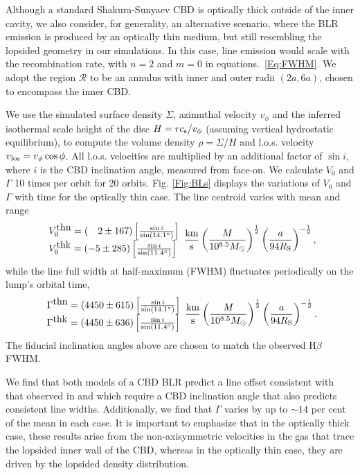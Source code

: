 Although a standard Shakura-Sunyaev CBD is optically thick outside of
the inner cavity, we also consider, for generality, an alternative
scenario, where the BLR emission is produced by an optically thin
medium, but still resembling the lopsided geometry in our
simulations. In this case, line emission would scale with the
recombination rate, with $n=2$ and $m=0$ in equations.~\ref{Eq:FWHM}. We
adopt the region $\mathcal{R}$ to be an annulus with inner and outer
radii $(2a, 6a)$, chosen to encompass the inner CBD.

We use the simulated surface density $\Sigma$, azimuthal velocity
$v_{\phi}$ and the inferred isothermal scale height of the disc $H =
rc_{\rm{s}}/v_{\phi}$ (assuming vertical hydrostatic equilibrium), to compute
the volume density $\rho = \Sigma/H$ and l.o.s. velocity
$v_{\rm{los}} = v_{\phi} \cos{\phi}$.  All l.o.s. velocities are
multiplied by an additional factor of $\sin i$, where $i$ is the CBD
inclination angle, measured from face-on.  We calculate $V_0$ and
$\Gamma$ 10 times per orbit for 20 orbits.  Fig. \ref{Fig:BLs}
displays the variations of $V_0$ and $\Gamma$ with time for the
optically thin case.  The line centroid varies with mean and range
\[
\begin{array}{l}
 V^{\mbox{thn}}_0=(\ \ \  2 \pm 167) \left[\frac{\sin i}{\sin (14.1^{\circ}) }\right] \\
 V^{\mbox{thk}}_0=(-5 \pm 285)  \left[\frac{\sin i}{\sin (11.4^{\circ}) }\right]
\end{array}
%
\frac{\rm km}{\rm s}
\left(\frac{M}{10^{8.5} \Msun}\right)^{\frac{1}{2}}
\left(\frac{a}{94 R_{\rm{S}} }\right)^{-\frac{1}{2}},
\]
 while the line full width at half-maximum (FWHM) fluctuates periodically on the lump's orbital time,
 \[
\begin{array}{l}
 \Gamma^{\mbox{thn}}  =  (4450 \pm 615)  \left[\frac{\sin i}{\sin (14.1^{\circ}) }\right] \\
\Gamma^{\mbox{thk}}  =  (4450 \pm 636)   \left[\frac{\sin i}{\sin (11.4^{\circ}) }\right]
\end{array}
%
\frac{\rm km}{\rm s}
\left(\frac{M}{10^{8.5} \Msun}\right)^{\frac{1}{2}}
\left(\frac{a}{94 R_{\rm{S}} }\right)^{-\frac{1}{2}}.
\]
The fiducial inclination angles above are chosen to match the observed H$\beta$ FWHM.




We find that both models of a CBD BLR predict a
line offset consistent with that observed in
\cite{Jackson:1992:PGHbeta} and which require a CBD inclination angle
that also predicts consistent line widths. Additionally, we find that
$\Gamma$ varies by up to $\sim 14$ per cent of the mean in each case.
It is important to emphasize that in the optically thick case, these
results arise from the non-axisymmetric velocities in the gas that
trace the lopsided inner wall of the CBD, whereas in the
optically thin case, they are driven by the lopsided density
distribution.

